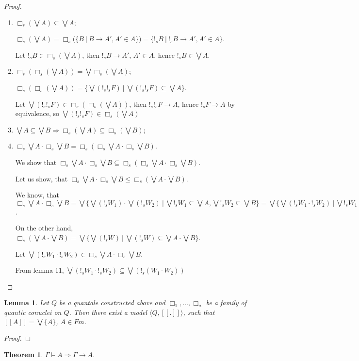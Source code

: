 \documentclass[a4paper]{article}
\newtheorem{theorem}{Theorem}
\newtheorem{lemma}{Lemma}
\begin{document}
\begin{proof}
$ $

\begin{enumerate}
  \item $\Box_s (\bigvee A) \subseteq \bigvee A$;

$\Box_s (\bigvee A) = \Box_s (\{ B \: | \: B \rightarrow A', A' \in A\}) =
\{ !_s B \: | \: !_s B \rightarrow A', A' \in A\}$.

Let $!_s B \in \Box_s (\bigvee A)$, then $!_s B \rightarrow A'$, $A' \in A$, hence $!_s B \in \bigvee A$.

  \item $\Box_s (\Box_s(\bigvee A)) = \bigvee \Box_s (\bigvee A)$;

$\Box_s (\Box_s(\bigvee A)) = \{ \bigvee (!_s !_s F) \: | \: \bigvee (!_s !_s F) \subseteq \bigvee A \}$.

Let $\bigvee (!_s !_s F) \in \Box_s (\Box_s(\bigvee A))$, then $!_s !_s F \rightarrow A$, hence
$!_s F \rightarrow A$ by equivalence, so $\bigvee (!_s !_s F) \in \Box_s (\bigvee A)$

  \item $\bigvee A \subseteq \bigvee B \Rightarrow \Box_s (\bigvee A) \subseteq \Box_s (\bigvee B)$;
  \item $\Box_s \bigvee A \cdot \Box_s \bigvee B = \Box_s (\Box_s \bigvee A \cdot \Box_s \bigvee B)$.

We show that $\Box_s \bigvee A \cdot \Box_s \bigvee B \subseteq \Box_s (\Box_s \bigvee A \cdot \Box_s \bigvee B)$.

Let us show, that $\Box_s \bigvee A \cdot \Box_s \bigvee B \leq \Box_s (\bigvee A \cdot \bigvee B)$.

We know, that $\Box_s \bigvee A \cdot \Box_s \bigvee B =
\bigvee \{ \bigvee (!_s W_1) \cdot \bigvee (!_s W_2) \: | \: \bigvee !_s W_1 \subseteq \bigvee A, \bigvee !_s W_2 \subseteq \bigvee B \} =
\bigvee \{ \bigvee (!_s W_1 \cdot !_s W_2) \: | \: \bigvee !_s W_1 \subseteq \bigvee A, \bigvee !_s W_2 \subseteq \bigvee B \}$.

On the other hand, $\Box_s (\bigvee A \cdot \bigvee B) = \bigvee \{ \bigvee (!_s W) \: | \: \bigvee (!_s W) \subseteq \bigvee A \cdot \bigvee B \}$.

Let $\bigvee (!_s W_1 \cdot !_s W_2) \in \Box_s \bigvee A \cdot \Box_s \bigvee B$.

From lemma 11, $\bigvee (!_s W_1 \cdot !_s W_2) \subseteq \bigvee (!_s (W_1 \cdot W_2))$

\end{enumerate}
\end{proof}

\begin{lemma}
  Let $Q$ be a quantale constructed above and $\Box_1, \dots, \Box_n$ be a family of quantic conuclei on $Q$.
  Then there exist a model $\langle Q, [\![.]\!]\rangle$, such that $[\![A]\!] = \bigvee \{ A \}$, $A \in Fm$.
\end{lemma}

\begin{proof}
\end{proof}

\begin{theorem}
  $\Gamma \models A \Rightarrow \Gamma \rightarrow A$.
\end{theorem}
\end{document}
